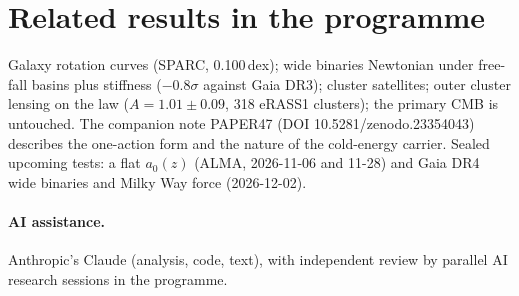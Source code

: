 \documentclass[10pt]{article}
\begin{document}
\section{Related results in the programme}
Galaxy rotation curves (SPARC, 0.100\,dex); wide binaries Newtonian under free-fall basins plus stiffness ($-0.8\sigma$ against Gaia DR3); cluster satellites; outer cluster lensing on the law ($A=1.01\pm0.09$, 318 eRASS1 clusters); the primary CMB is untouched. The companion note PAPER47 (DOI 10.5281/zenodo.23354043) describes the one-action form and the nature of the cold-energy carrier. Sealed upcoming tests: a flat $a_0(z)$ (ALMA, 2026-11-06 and 11-28) and Gaia DR4 wide binaries and Milky Way force (2026-12-02).

\paragraph{AI assistance.} Anthropic's Claude (analysis, code, text), with independent review by parallel AI research sessions in the programme.
\end{document}
